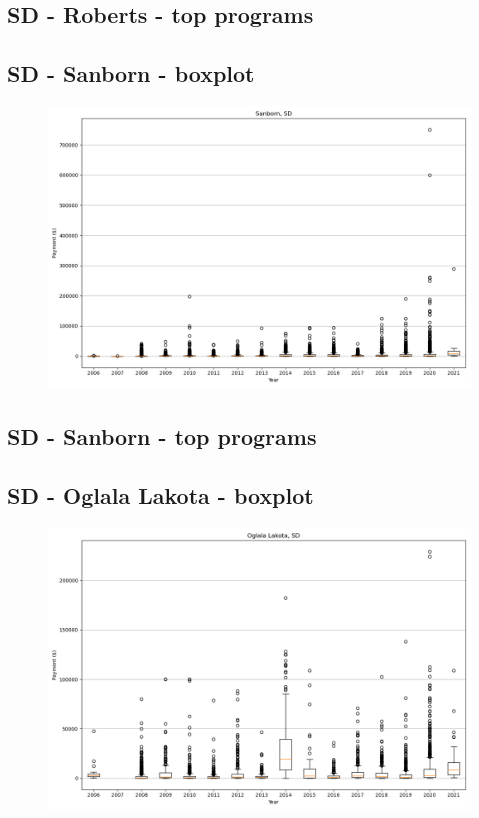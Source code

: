 \subsection*{SD - Roberts - top programs}

\newpage
\subsection*{SD - Sanborn - boxplot}
\begin{figure}[h]
\centering
\includegraphics[width=7in]{../output/boxplots/counties/Sanborn-SD_boxplot.png}
\end{figure}


\subsection*{SD - Sanborn - top programs}

\newpage
\subsection*{SD - Oglala Lakota - boxplot}
\begin{figure}[h]
\centering
\includegraphics[width=7in]{../output/boxplots/counties/Oglala Lakota-SD_boxplot.png}
\end{figure}


